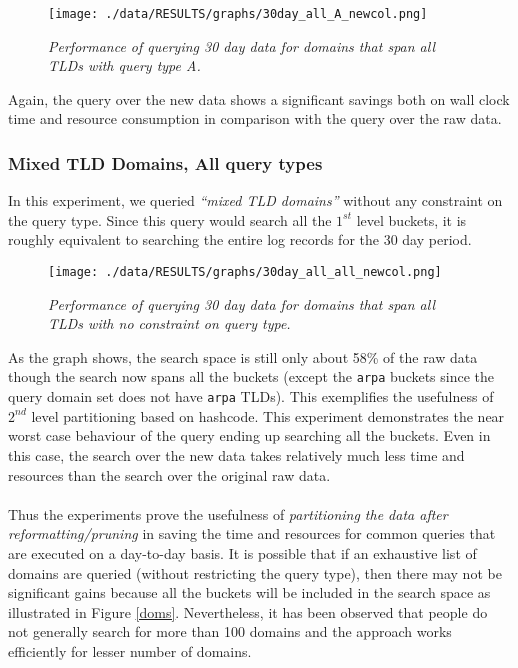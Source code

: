\documentclass[11pt,a4paper]{article}
\begin{document}
\begin{figure}[H] 
\centering
\texttt{[image: ./data/RESULTS/graphs/30day\_all\_A\_newcol.png]}
\caption {\textit{Performance of querying 30 day data for domains that span all TLDs with query type A.}}
\label{allafigure}
\end{figure}

\noindent
Again, the query over the new data shows a significant savings both on wall clock time and resource consumption in comparison with the query over the raw data.

\subsubsection{Mixed TLD Domains, All query types}
In this experiment, we queried \textit{``mixed TLD domains''} without any constraint on the query type. Since this query would search all the $1^{st}$ level buckets, it is roughly equivalent to searching the entire log records for the 30 day period.

\begin{figure}[H] 
\centering
\texttt{[image: ./data/RESULTS/graphs/30day\_all\_all\_newcol.png]}
\caption {\textit{Performance of querying 30 day data for domains that span all TLDs with no constraint on query type.}}
\end{figure}

\noindent
As the graph shows, the search space is still only about 58\% of the raw data though the search now spans all the buckets (except the \texttt{arpa} buckets since the query domain set does not have \texttt{arpa} TLDs). This exemplifies the usefulness of $2^{nd}$ level partitioning based on hashcode. This experiment demonstrates the near worst case behaviour of the query ending up searching all the buckets. Even in this case, the search over the new data takes relatively much less time and resources than the search over the original raw data.
\\\\
Thus the experiments prove the usefulness of \textit{partitioning the data after reformatting/pruning} in saving the time and resources for common queries that are executed on a day-to-day basis. It is possible that if an exhaustive list of domains are queried (without restricting the query type), then there may not be significant gains because all the buckets will be included in the search space as illustrated in Figure \ref{doms}. Nevertheless, it has been observed that people do not generally search for more than 100 domains and the approach works efficiently for lesser number of domains.
\end{document}
